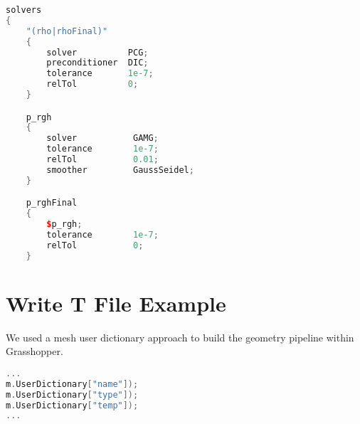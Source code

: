 \begin{theappendices}
\begin{lstlisting}[language=c++, caption=OF dictiorary in $system/Brick/fvSolution$]
solvers
{
    "(rho|rhoFinal)"
    {
        solver          PCG;
        preconditioner  DIC;
        tolerance       1e-7;
        relTol          0;
    }

    p_rgh
    {
        solver           GAMG;
        tolerance        1e-7;
        relTol           0.01;
        smoother         GaussSeidel;
    }

    p_rghFinal
    {
        $p_rgh;
        tolerance        1e-7;
        relTol           0;
    }

\end{lstlisting}




\singlespacing
\chapter{Write T File Example}

We used a mesh user dictionary approach to build the geometry pipeline within Grasshopper.

\begin{lstlisting}[language=c++, caption= Code to handle OF dictionary in $0/Brick/T$]
...
m.UserDictionary["name"]);
m.UserDictionary["type"]);
m.UserDictionary["temp"]);
...
\end{lstlisting}







\normalsize
\singlespacing

\end{theappendices}
